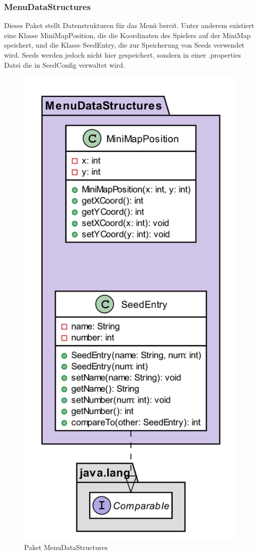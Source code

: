 
\subsubsection{MenuDataStructures}
Dieses Paket stellt Datenstrukturen für das Menü bereit. 
Unter anderem existiert eine Klasse MiniMapPosition, die 
die Koordinaten des Spielers auf der MiniMap speichert, 
und die Klasse SeedEntry, die zur Speicherung von Seeds 
verwendet wird. Seeds werden jedoch nicht hier gespeichert, 
sondern in einer .properties Datei die in SeedConfig
verwaltet wird.
\par

\begin{figure}[!h]
    \centering
    \centering
        \includegraphics[width=.45\linewidth]{./GUI/GUI_Bilder/MenuDataStructures.png}
          \caption{Paket MenuDataStructures}
           \label{fig:MenuDataStructures}
\end{figure}
    \pagebreak

